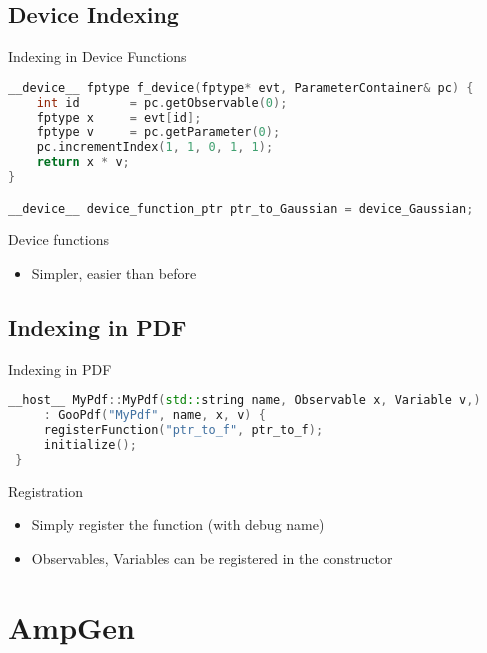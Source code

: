 \documentclass[aspectratio=169, smaller]{beamer}
\begin{document}
\subsection{Device Indexing}
\begin{frame}[fragile]{Indexing in Device Functions}
\begin{lstlisting}[language=C++]
__device__ fptype f_device(fptype* evt, ParameterContainer& pc) {
    int id       = pc.getObservable(0);
    fptype x     = evt[id];
    fptype v     = pc.getParameter(0);
    pc.incrementIndex(1, 1, 0, 1, 1);
    return x * v;
}

__device__ device_function_ptr ptr_to_Gaussian = device_Gaussian;
\end{lstlisting}

\begin{block}{Device functions}
    \begin{itemize}
        \item Simpler, easier than before
    \end{itemize}
\end{block}
\end{frame}

\subsection{Indexing in PDF}
\begin{frame}[fragile]{Indexing in PDF}
\begin{lstlisting}[language=C++]
 __host__ MyPdf::MyPdf(std::string name, Observable x, Variable v,)
     : GooPdf("MyPdf", name, x, v) {
     registerFunction("ptr_to_f", ptr_to_f);
     initialize();
 }
\end{lstlisting}

\begin{block}{Registration}
    \begin{itemize}
        \item Simply register the function (with debug name)
        \item Observables, Variables can be registered in the constructor
    \end{itemize}
\end{block}
\end{frame}

\section{AmpGen}
\end{document}
